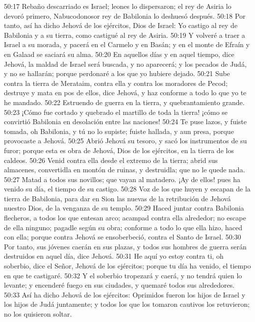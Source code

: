 50:17 Rebaño descarriado es Israel; leones lo dispersaron; el rey de Asiria lo devoró primero, Nabucodonosor rey de Babilonia lo deshuesó después.  
50:18 Por tanto, así ha dicho Jehová de los ejércitos, Dios de Israel: Yo castigo al rey de Babilonia y a su tierra, como castigué al rey de Asiria.  
50:19 Y volveré a traer a Israel a su morada, y pacerá en el Carmelo y en Basán; y en el monte de Efraín y en Galaad se saciará su alma.  
50:20 En aquellos días y en aquel tiempo, dice Jehová, la maldad de Israel será buscada, y no aparecerá; y los pecados de Judá, y no se hallarán; porque perdonaré a los que yo hubiere dejado.  
50:21 Sube contra la tierra de Merataim, contra ella y contra los moradores de Pecod; destruye y mata en pos de ellos, dice Jehová, y haz conforme a todo lo que yo te he mandado.  
50:22 Estruendo de guerra en la tierra, y quebrantamiento grande.  
50:23 ¡Cómo fue cortado y quebrado el martillo de toda la tierra! ¡cómo se convirtió Babilonia en desolación entre las naciones!  
50:24 Te puse lazos, y fuiste tomada, oh Babilonia, y tú no lo supiste; fuiste hallada, y aun presa, porque provocaste a Jehová.  
50:25 Abrió Jehová su tesoro, y sacó los instrumentos de su furor; porque esta es obra de Jehová, Dios de los ejércitos, en la tierra de los caldeos.  
50:26 Venid contra ella desde el extremo de la tierra; abrid sus almacenes, convertidla en montón de ruinas, y destruidla; que no le quede nada.  
50:27 Matad a todos sus novillos; que vayan al matadero. ¡Ay de ellos! pues ha venido su día, el tiempo de su castigo.  
50:28 Voz de los que huyen y escapan de la tierra de Babilonia, para dar en Sion las nuevas de la retribución de Jehová nuestro Dios, de la venganza de su templo.  
50:29 Haced juntar contra Babilonia flecheros, a todos los que entesan arco; acampad contra ella alrededor; no escape de ella ninguno; pagadle según su obra; conforme a todo lo que ella hizo, haced con ella; porque contra Jehová se ensoberbeció, contra el Santo de Israel.  
50:30 Por tanto, sus jóvenes caerán en sus plazas, y todos sus hombres de guerra serán destruidos en aquel día, dice Jehová.  
50:31 He aquí yo estoy contra ti, oh soberbio, dice el Señor, Jehová de los ejércitos; porque tu día ha venido, el tiempo en que te castigaré.  
50:32 Y el soberbio tropezará y caerá, y no tendrá quien lo levante; y encenderé fuego en sus ciudades, y quemaré todos sus alrededores.  
50:33 Así ha dicho Jehová de los ejércitos: Oprimidos fueron los hijos de Israel y los hijos de Judá juntamente; y todos los que los tomaron cautivos los retuvieron; no los quisieron soltar.  
